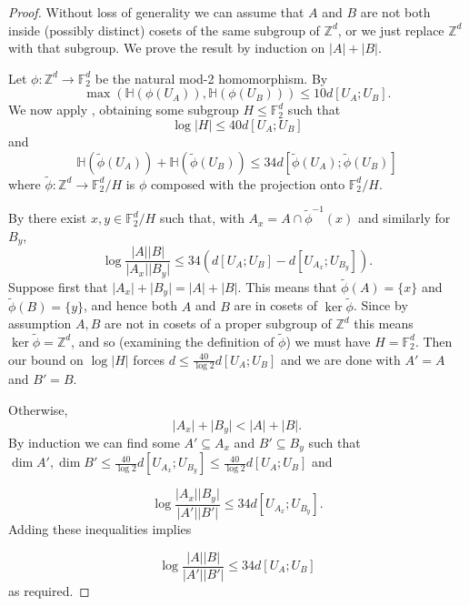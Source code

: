 \documentclass[10pt,a4paper]{article}
\newcommand{\uses}[1]{}
\newcommand{\leanok}{}
\begin{document}
\begin{proof}
\uses{torsion-dist-shrinking, pfr-projection, single-fibres, dimension-def}\leanok
Without loss of generality we can assume that $A$ and $B$ are not both inside (possibly distinct) cosets of the same subgroup of $\mathbb{Z}^d$, or we just replace $\mathbb{Z}^d$ with that subgroup. We prove the result by induction on $\lvert A\rvert+\lvert B\rvert$.

Let $\phi:\mathbb{Z}^d\to \mathbb{F}_2^d$ be the natural mod-2 homomorphism. By 
\[\max(\mathbb{H}(\phi(U_A)),\mathbb{H}(\phi(U_B)))\leq 10d[U_A;U_B].\]
We now apply , obtaining some subgroup $H\leq \mathbb{F}_2^d$ such that
\[\log \lvert H\rvert \leq 40d[U_A;U_B]\]
and
\[\mathbb{H}(\tilde{\phi}(U_A))+\mathbb{H}(\tilde{\phi}(U_B))\leq 34 d[\tilde{\phi}(U_A);\tilde{\phi}(U_B)]\]
where $\tilde{\phi}:\mathbb{Z}^d\to \mathbb{F}_2^d/H$ is $\phi$ composed with the projection onto $\mathbb{F}_2^d/H$.


By  there exist $x,y\in \mathbb{F}_2^d/H$ such that, with $A_x=A\cap \tilde{\phi}^{-1}(x)$ and similarly for $B_y$,
\[\log \frac{\lvert A\rvert\lvert B\rvert}{\lvert A_x\rvert\lvert B_y\rvert}\leq 34(d[U_A;U_B]-d[U_{A_x};U_{B_y}]).\]
Suppose first that $\lvert A_x\rvert+\lvert B_y\rvert=\lvert A\rvert+\lvert B\rvert$. This means that $\tilde{\phi}(A)=\{x\}$ and $\tilde{\phi}(B)=\{y\}$, and hence both $A$ and $B$ are in cosets of $\ker \tilde{\phi}$. Since by assumption $A,B$ are not in cosets of a proper subgroup of $\mathbb{Z}^d$ this means $\ker\tilde{\phi}=\mathbb{Z}^d$, and so (examining the definition of $\tilde{\phi}$) we must have $H=\mathbb{F}_2^d$. Then our bound on $\log\lvert H\rvert$ forces $d\leq \frac{40}{\log 2}d[U_A;U_B]$ and we are done with $A'=A$ and $B'=B$.

Otherwise,
\[\lvert A_x\rvert+\lvert B_y\rvert <\lvert A\rvert+\lvert B\rvert.\]
By induction we can find some $A'\subseteq A_x$ and $B'\subseteq B_y$ such that $\dim A',\dim B'\leq \frac{40}{\log 2} d[U_{A_x};U_{B_y}]\leq \frac{40}{\log 2}d[U_A;U_B]$ and

\[\log \frac{\lvert A_x\rvert\lvert B_y\rvert}{\lvert A'\rvert\lvert B'\rvert}\leq 34d[U_{A_x};U_{B_y}].\]
Adding these inequalities implies

\[\log\frac{\lvert A\rvert\lvert B\rvert}{\lvert A'\rvert\lvert B'\rvert}\leq 34d[U_A;U_B]\]
as required.
\end{proof}
\end{document}
